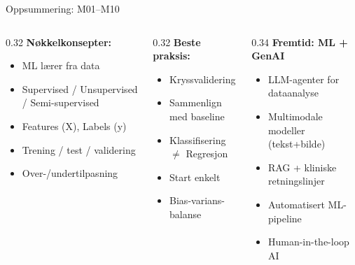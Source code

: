 \documentclass[aspectratio=169, 10pt]{beamer}
\begin{document}
\begin{frame}{Oppsummering: M01--M10}
    \vspace{-2mm}
    \begin{columns}
        \begin{column}{0.32\textwidth}
            \textbf{\footnotesize Nøkkelkonsepter:}
            \scriptsize
            \begin{itemize}\setlength{\itemsep}{0pt}
                \item ML lærer fra data
                \item Supervised / Unsupervised / Semi-supervised
                \item Features (X), Labels (y)
                \item Trening / test / validering
                \item Over-/undertilpasning
            \end{itemize}
        \end{column}
        \begin{column}{0.32\textwidth}
            \textbf{\footnotesize Beste praksis:}
            \scriptsize
            \begin{itemize}\setlength{\itemsep}{0pt}
                \item Kryssvalidering
                \item Sammenlign med baseline
                \item Klassifisering $\neq$ Regresjon
                \item Start enkelt
                \item Bias-varians-balanse
            \end{itemize}
        \end{column}
        \begin{column}{0.34\textwidth}
            \textbf{\footnotesize Fremtid: ML + GenAI}
            \scriptsize
            \begin{itemize}\setlength{\itemsep}{0pt}
                \item LLM-agenter for dataanalyse
                \item Multimodale modeller (tekst+bilde)
                \item RAG + kliniske retningslinjer
                \item Automatisert ML-pipeline
                \item Human-in-the-loop AI
            \end{itemize}
        \end{column}
    \end{columns}


\end{frame}
\end{document}
